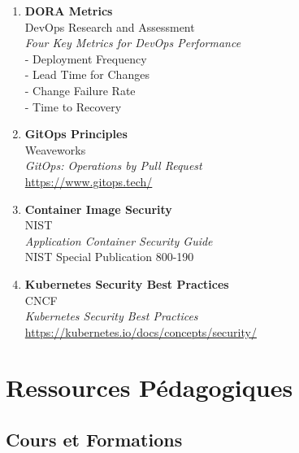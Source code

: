\begin{enumerate}
    \item \textbf{DORA Metrics} \\
    DevOps Research and Assessment \\
    \textit{Four Key Metrics for DevOps Performance} \\
    - Deployment Frequency \\
    - Lead Time for Changes \\
    - Change Failure Rate \\
    - Time to Recovery

    \item \textbf{GitOps Principles} \\
    Weaveworks \\
    \textit{GitOps: Operations by Pull Request} \\
    \url{https://www.gitops.tech/}

    \item \textbf{Container Image Security} \\
    NIST \\
    \textit{Application Container Security Guide} \\
    NIST Special Publication 800-190

    \item \textbf{Kubernetes Security Best Practices} \\
    CNCF \\
    \textit{Kubernetes Security Best Practices} \\
    \url{https://kubernetes.io/docs/concepts/security/}
\end{enumerate}

\section{Ressources Pédagogiques}

\subsection{Cours et Formations}

